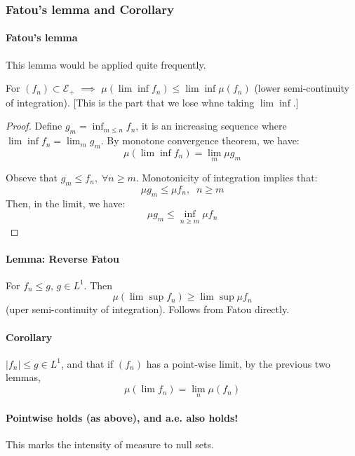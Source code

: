 \documentclass[11pt]{article}
\newcommand{\m}{\mathcal}
\begin{document}
        \subsubsection{Fatou's lemma and Corollary}
        \paragraph{Fatou's lemma}This lemma would be applied quite frequently. 
        \label{lemma:somethingelse}

        For $(f_n) \subset \m E_+$ $\implies $ $\mu ( \lim \inf f_n) \le \lim \inf \mu
        (f_n)$ (lower semi-continuity of integration). [This is the part that we lose
        whne taking $\lim \inf$.]

        \begin{proof}
          Define $g_m = \inf_{m\le n} f_n$, it is an increasing sequence where $\lim \inf f_n = \lim_m  g_m$.
          By monotone convergence theorem, we have: 
          \[\mu ( \lim \inf f_n ) = \lim_m \mu g_m
          \]

          Obseve that $g_m \le f_n, \; \forall n \ge m$. Monotonicity of integration
          implies that: 
          \[ \mu g_m \le \mu f_n, \;\; n \ge m\]
          Then, in the limit, we have: 
          \[\mu g_m \le \inf _{n \ge m} \mu f_n\]

        \end{proof}

        \paragraph{Lemma: Reverse Fatou }
        \label{lemma:fatou-reverse-sup}
        For $f_n \le g$, $g \in L^1$. Then 
        \[
          \mu (\lim \sup f_n) \ge \lim \sup \mu f_n
        \]
        (uper semi-continuity of integration). Follows from Fatou directly. 

        \paragraph{Corollary}
        \label{coro:fatou}
        $|f_n| \le g \in L^1$, and that if $(f_n)$ has a point-wise limit, by the
        previous two lemmas, 
        \[
          \mu ( \lim f_n) = \lim _ n \mu (f_n)
        \]

        \paragraph{Pointwise holds (as above), and a.e. also holds!} This marks the
        intensity of measure to null sets.
\end{document}
